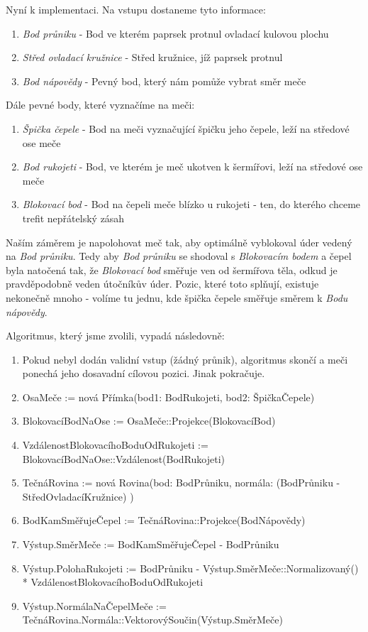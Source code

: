 \pagebreak

Nyní k implementaci. Na vstupu dostaneme tyto informace:
\begin{enumerate}
    \item \textit{Bod průniku} - Bod ve kterém paprsek protnul ovladací kulovou plochu
    \item \textit{Střed ovladací kružnice} - Střed kružnice, jíž paprsek protnul
    \item \textit{Bod nápovědy} - Pevný bod, který nám pomůže vybrat směr meče
\end{enumerate}

Dále pevné body, které vyznačíme na meči:
\begin{enumerate}
    \item \textit{Špička čepele} - Bod na meči vyznačující špičku jeho čepele, leží na středové ose meče
    \item \textit{Bod rukojeti} - Bod, ve kterém je meč ukotven k šermířovi, leží na středové ose meče
    \item \textit{Blokovací bod} - Bod na čepeli meče blízko u rukojeti - ten, do kterého chceme trefit nepřátelský zásah 
\end{enumerate}

Naším záměrem je napolohovat meč tak, aby optimálně vyblokoval úder vedený na \textit{Bod průniku}. Tedy aby \textit{Bod průniku} se shodoval s \textit{Blokovacím bodem} a čepel byla natočená tak, že \textit{Blokovací bod} směřuje ven od šermířova těla, odkud je pravděpodobně veden útočníkův úder. Pozic, které toto splňují, existuje nekonečně mnoho - volíme tu jednu, kde špička čepele směřuje směrem k \textit{Bodu nápovědy}.

Algoritmus, který jsme zvolili, vypadá následovně:
\begin{enumerate}
    \addtocounter{enumi}{-1}
    \item Pokud nebyl dodán validní vstup (žádný průnik), algoritmus skončí a meči ponechá jeho dosavadní cílovou pozici. Jinak pokračuje.
    \bigbreak
    \item OsaMeče := nová Přímka(bod1: BodRukojeti, bod2: ŠpičkaČepele)
    \item BlokovacíBodNaOse := OsaMeče::Projekce(BlokovacíBod)
    \item VzdálenostBlokovacíhoBoduOdRukojeti := BlokovacíBodNaOse::Vzdálenost(BodRukojeti)
    \bigbreak
    \item TečnáRovina := nová Rovina(bod: BodPrůniku, normála: (BodPrůniku - StředOvladacíKružnice) )
    \item BodKamSměřujeČepel := TečnáRovina::Projekce(BodNápovědy)
    \bigbreak
    \item Výstup.SměrMeče := BodKamSměřujeČepel - BodPrůniku
    \item Výstup.PolohaRukojeti := BodPrůniku - Výstup.SměrMeče::Normalizovaný() * VzdálenostBlokovacíhoBoduOdRukojeti
    \item Výstup.NormálaNaČepelMeče := TečnáRovina.Normála::VektorovýSoučin(Výstup.SměrMeče)
\end{enumerate}


